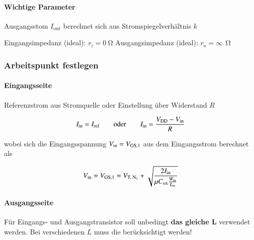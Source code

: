\paragraph{Wichtige Parameter} 

\begin{minipage}[t]{0.48\columnwidth}
    \begin{outline}
        \1 Ausgangsstom $I_\text{out}$ berechnet sich aus Stromspiegelverhältnis $k$
    \end{outline}
\end{minipage}
\hfill
\begin{minipage}[t]{0.48\columnwidth}
    \begin{outline}
        \1 Eingangsimpedanz (ideal): $r_i = \qty{0}{\ohm}$
        \1 Ausgangsimpedanz (ideal): $r_o = \infty \, \qty{}{\ohm}$
    \end{outline}
\end{minipage}



\subsubsection{Arbeitspunkt festlegen}

\paragraph{Eingangsseite}

Referenzstrom aus Stromquelle oder Einstellung über Widerstand $R$

\vspace{-0.2cm}

\[
    I_\text{in} = I_\text{ref} \qquad \text{oder} \qquad I_\text{in} = \frac{V_{\rm DD} - V_{\rm in}}{R}
\]

wobei sich die Eingangsspannung $V_{\rm in} = V_{\rm GS,1}$ aus dem Eingangsstrom berechnet als

\vspace{-0.2cm}

\[
    V_\text{in} = V_{\rm GS,1} = V_{\text{T, N}_1} + \sqrt{\frac{2 I_\text{in}}{\mu C_\text{ox}\frac{W_{\rm in}}{L_{\rm in}}}}
\]



\paragraph{Ausgangsseite}

Für Eingangs- und Ausgangstransistor soll unbedingt \textbf{das gleiche $\bm{L}$} verwendet werden.
Bei verschiedenen $L$ muss die  berücksichtigt werden!

